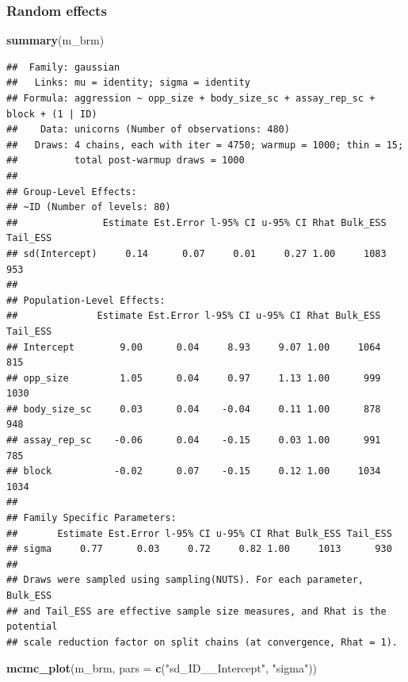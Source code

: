 \documentclass[
  12pt,
]{book}
\newenvironment{Shaded}{\begin{snugshade}}{\end{snugshade}}
\newcommand{\DataTypeTok}[1]{\textcolor[rgb]{0.13,0.29,0.53}{#1}}
\newcommand{\KeywordTok}[1]{\textcolor[rgb]{0.13,0.29,0.53}{\textbf{#1}}}
\newcommand{\NormalTok}[1]{#1}
\newcommand{\StringTok}[1]{\textcolor[rgb]{0.31,0.60,0.02}{#1}}
\begin{document}
\hypertarget{random-effects-3}{%
\subsubsection{Random effects}\label{random-effects-3}}

\begin{Shaded}
\begin{Highlighting}[]
\KeywordTok{summary}\NormalTok{(m\_brm)}
\end{Highlighting}
\end{Shaded}

\begin{verbatim}
##  Family: gaussian 
##   Links: mu = identity; sigma = identity 
## Formula: aggression ~ opp_size + body_size_sc + assay_rep_sc + block + (1 | ID) 
##    Data: unicorns (Number of observations: 480) 
##   Draws: 4 chains, each with iter = 4750; warmup = 1000; thin = 15;
##          total post-warmup draws = 1000
## 
## Group-Level Effects: 
## ~ID (Number of levels: 80) 
##               Estimate Est.Error l-95% CI u-95% CI Rhat Bulk_ESS Tail_ESS
## sd(Intercept)     0.14      0.07     0.01     0.27 1.00     1083      953
## 
## Population-Level Effects: 
##              Estimate Est.Error l-95% CI u-95% CI Rhat Bulk_ESS Tail_ESS
## Intercept        9.00      0.04     8.93     9.07 1.00     1064      815
## opp_size         1.05      0.04     0.97     1.13 1.00      999     1030
## body_size_sc     0.03      0.04    -0.04     0.11 1.00      878      948
## assay_rep_sc    -0.06      0.04    -0.15     0.03 1.00      991      785
## block           -0.02      0.07    -0.15     0.12 1.00     1034     1034
## 
## Family Specific Parameters: 
##       Estimate Est.Error l-95% CI u-95% CI Rhat Bulk_ESS Tail_ESS
## sigma     0.77      0.03     0.72     0.82 1.00     1013      930
## 
## Draws were sampled using sampling(NUTS). For each parameter, Bulk_ESS
## and Tail_ESS are effective sample size measures, and Rhat is the potential
## scale reduction factor on split chains (at convergence, Rhat = 1).
\end{verbatim}

\begin{Shaded}
\begin{Highlighting}[]
\KeywordTok{mcmc\_plot}\NormalTok{(m\_brm, }\DataTypeTok{pars =} \KeywordTok{c}\NormalTok{(}\StringTok{"sd\_ID\_\_Intercept"}\NormalTok{, }\StringTok{"sigma"}\NormalTok{))}
\end{Highlighting}
\end{Shaded}
\end{document}

